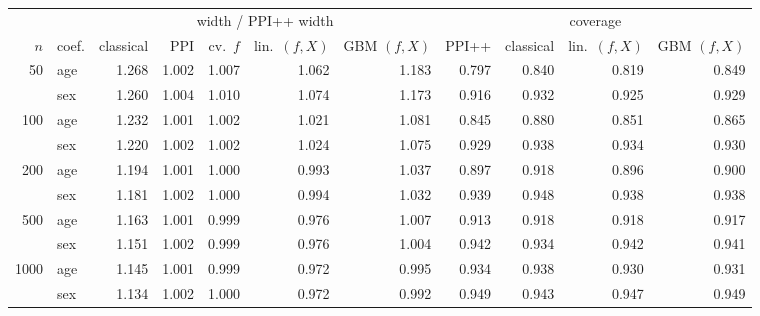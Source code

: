 \scriptsize\setlength{\tabcolsep}{3pt}\renewcommand{\arraystretch}{0.84}\begin{tabular}{rlrrrrr|rrrr}
\toprule
 & & \multicolumn{5}{c}{width / PPI++ width} & \multicolumn{4}{|c}{coverage} \\
\cmidrule(lr){3-7}\cmidrule(l){8-11}
$n$ & coef. & classical & PPI & cv.\ $f$ & lin.\ $(f,X)$ & GBM $(f,X)$ & PPI++ & classical & lin.\ $(f,X)$ & GBM $(f,X)$ \\
\midrule
50 & age & 1.268 & 1.002 & 1.007 & 1.062 & 1.183 & 0.797 & 0.840 & 0.819 & 0.849 \\
 & sex & 1.260 & 1.004 & 1.010 & 1.074 & 1.173 & 0.916 & 0.932 & 0.925 & 0.929 \\
100 & age & 1.232 & 1.001 & 1.002 & 1.021 & 1.081 & 0.845 & 0.880 & 0.851 & 0.865 \\
 & sex & 1.220 & 1.002 & 1.002 & 1.024 & 1.075 & 0.929 & 0.938 & 0.934 & 0.930 \\
200 & age & 1.194 & 1.001 & 1.000 & 0.993 & 1.037 & 0.897 & 0.918 & 0.896 & 0.900 \\
 & sex & 1.181 & 1.002 & 1.000 & 0.994 & 1.032 & 0.939 & 0.948 & 0.938 & 0.938 \\
500 & age & 1.163 & 1.001 & 0.999 & 0.976 & 1.007 & 0.913 & 0.918 & 0.918 & 0.917 \\
 & sex & 1.151 & 1.002 & 0.999 & 0.976 & 1.004 & 0.942 & 0.934 & 0.942 & 0.941 \\
1000 & age & 1.145 & 1.001 & 0.999 & 0.972 & 0.995 & 0.934 & 0.938 & 0.930 & 0.931 \\
 & sex & 1.134 & 1.002 & 1.000 & 0.972 & 0.992 & 0.949 & 0.943 & 0.947 & 0.949 \\
\bottomrule
\end{tabular}

